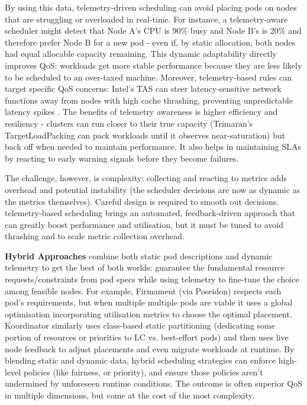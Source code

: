 By using this data, telemetry-driven scheduling can avoid placing pods on nodes
that are struggling or overloaded in real-time. For instance, a telemetry-aware
scheduler might detect that Node A's CPU is 90\% busy and Node B's is 20\% and
therefore prefer Node B for a new pod - even if, by static allocation, both
nodes had equal allocable capacity remaining. This dynamic adaptability
directly improves QoS: workloads get more stable performance because they are
less likely to be scheduled to an over-taxed machine. Moreover, telemetry-based
rules can target specific QoS concerns: Intel's TAS can steer latency-sensitive
network functions away from nodes with high cache thrashing, preventing
unpredictable latency spikes \cite{intel-tas}. The benefits of telemetry awareness is
higher efficiency and resiliency - clusters can run closer to their true capacity
(Trimaran's TargetLoadPacking can pack workloads until it observes
near-saturation) but back off when needed to maintain performance. It also helps
in maintaining SLAs by reacting to early warning signals before they become
failures.

The challenge, however, is complexity: collecting and reacting to metrics adds
overhead and potential instability (the scheduler decisions are now as dynamic
as the metrics themselves). Careful design is required to smooth out decisions.
telemetry-based scheduling brings an automated, feedback-driven approach that
can greatly boost performance and utilisation, but it must be tuned to avoid
thrashing and to scale metric collection overhead.

\textbf{Hybrid Approaches} combine both static pod descriptions and dynamic
telemetry to get the best of both worlds: guarantee the fundamental resource
requests/constraints from pod specs while using telemetry to fine-tune the
choice among feasible nodes. For example, Firmament (via Poseidon)
\cite{gog_firmament_2016, poseidon} respects each pod's requirements, but when
multiple multiple pods are viable it uses a global optimisation incorporating
utilisation metrics to choose the optimal placement. Koordinator
\cite{netto_koordinator_2018} similarly uses class-based static partitioning
(dedicating some portion of resources or priorities to LC vs. best-effort pods)
and then uses live node feedback to adjust placements and even migrate
workloads at runtime. By blending static and dynamic data, hybrid scheduling
strategies can enforce high-level policies (like fairness, or priority), and
ensure those policies aren't undermined by unforeseen runtime conditions. The
outcome is often superior QoS in multiple dimensions, but come at the cost of
the most complexity.

